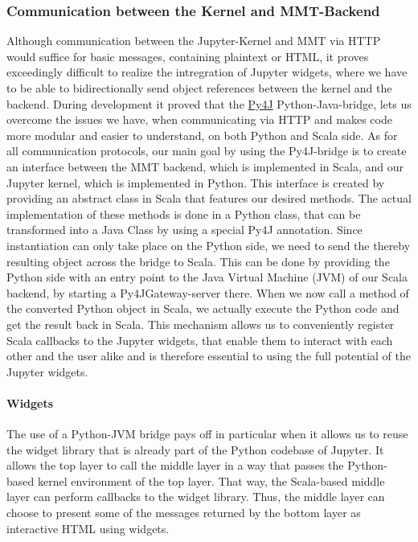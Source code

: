 \subsubsection{Communication between the Kernel and MMT-Backend}
Although communication between the Jupyter-Kernel and MMT via HTTP would suffice for basic messages, containing plaintext or HTML, it proves exceedingly difficult to realize the intregration of Jupyter widgets, where we have to be able to bidirectionally send object references between the kernel and the backend. During development it proved that the \hyperlink{https://www.py4j.org/}{Py4J} Python-Java-bridge, lets us overcome the issues we have, when communicating via HTTP and makes code more modular and easier to understand, on both Python and Scala side. As for all communication protocols, our main goal by using the Py4J-bridge is to create an interface between the MMT backend, which is implemented in Scala, and our Jupyter kernel, which is implemented in Python. This interface is created by providing an abstract class in Scala that features our desired methods. The actual implementation of these methods is done in a Python class, that can be transformed into a Java Class by using a special Py4J annotation. Since instantiation can only take place on the Python side, we need to send the thereby resulting object across the bridge to Scala. This can be done by providing the Python side with an entry point to the Java Virtual Machine (JVM) of our Scala backend, by starting a Py4JGateway-server there. When we now call a method of the converted Python object in Scala, we actually execute the Python code and get the result back in Scala. This mechanism allows us to conveniently register Scala callbacks to the Jupyter widgets, that enable them to interact with each other and the user alike and is therefore essential to using the full potential of the Jupyter widgets.


\paragraph{Widgets}
The use of a Python-JVM bridge pays off in particular when it allows us to reuse the widget library that is already part of the Python codebase of Jupyter.
It allows the top layer to call the middle layer in a way that passes the Python-based kernel environment of the top layer.
That way, the Scala-based middle layer can perform callbacks to the widget library.
Thus, the middle layer can choose to present some of the messages returned by the bottom layer as interactive HTML using widgets.

